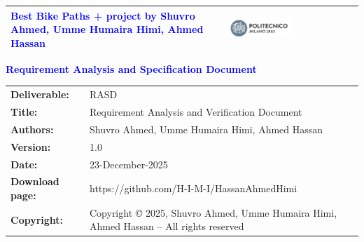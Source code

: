 \documentclass[11pt]{article}
\begin{document}

\begin{titlepage}



\begin{table}[t!]
\centering
\begin{tabular}{>{\raggedleft\arraybackslash}p{}|>{\raggedright\arraybackslash}p{}}
\hline
\textcolor{Blue}{\textbf{\small{Best Bike Paths + project by Shuvro Ahmed, Umme Humaira Himi, Ahmed Hassan}}} & \includegraphics[width=0.5\textwidth]{Images/PolimiLogo} \\
\hline
\end{tabular}
\end{table}
\vspace{7cm}

\begin{flushleft}

{\textcolor{Blue}{\textbf{\Huge{Requirement Analysis and Specification
        Document}}}} \\ [1cm]

\end{flushleft}

\end{titlepage}

\begin{table}[h!]
\begin{tabular}{|p{}|p{}|}
\hline
    \textbf{Deliverable:} & RASD \\
    \textbf{Title:} & Requirement Analysis and Verification Document \\
    \textbf{Authors:} & Shuvro Ahmed, Umme Humaira Himi, Ahmed Hassan \\
    \textbf{Version:} & 1.0 \\
    \textbf{Date:} & 23-December-2025 \\
    \textbf{Download page:} & https://github.com/H-I-M-I/HassanAhmedHimi \\
    \textbf{Copyright:} & Copyright © 2025, Shuvro Ahmed, Umme Humaira Himi, Ahmed Hassan – All rights reserved \\
\hline
\end{tabular}
\end{table}
\end{document}
